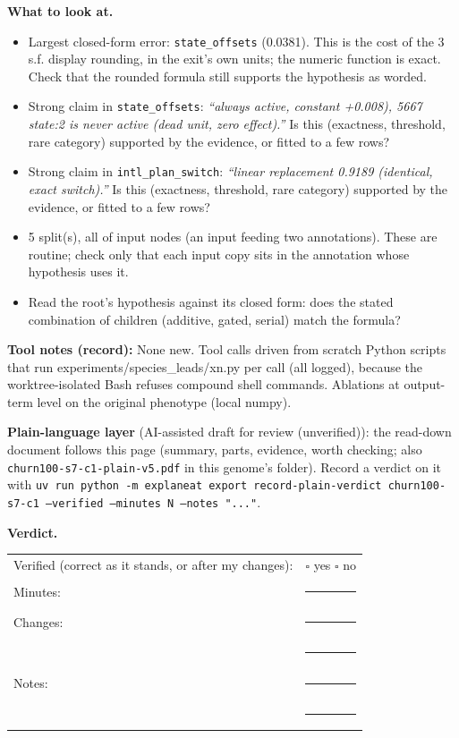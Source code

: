 \documentclass[a4paper,11pt]{article}
\begin{document}
\textbf{What to look at.}
\begin{itemize}
\item Largest closed-form error: \texttt{state\_\allowbreak{}offsets} (0.0381). This is the cost of the 3 s.f. display rounding, in the exit's own units; the numeric function is exact. Check that the rounded formula still supports the hypothesis as worded.
\item Strong claim in \texttt{state\_\allowbreak{}offsets}: \emph{``always active, constant +0.008), 5667 state:2 is never active (dead unit, zero effect).''} Is this (exactness, threshold, rare category) supported by the evidence, or fitted to a few rows?
\item Strong claim in \texttt{intl\_\allowbreak{}plan\_\allowbreak{}switch}: \emph{``linear replacement 0.9189 (identical, exact switch).''} Is this (exactness, threshold, rare category) supported by the evidence, or fitted to a few rows?
\item 5 split(s), all of input nodes (an input feeding two annotations). These are routine; check only that each input copy sits in the annotation whose hypothesis uses it.
\item Read the root's hypothesis against its closed form: does the stated combination of children (additive, gated, serial) match the formula?
\end{itemize}
\textbf{Tool notes (record):} None new. Tool calls driven from scratch Python scripts that run experiments/\allowbreak{}species\_\allowbreak{}leads/\allowbreak{}xn.py per call (all logged), because the worktree-isolated Bash refuses compound shell commands. Ablations at output-term level on the original phenotype (local numpy).

\textbf{Plain-language layer} (AI-assisted draft for review (unverified)): the read-down document follows this page (summary, parts, evidence, worth checking; also \texttt{churn100-s7-c1-plain-v5.pdf} in this genome's folder). Record a verdict on it with \texttt{uv run python -m explaneat export record-plain-verdict churn100-s7-c1 --verified --minutes N --notes "..."}.

\textbf{Verdict.}

\begin{tabularx}{\linewidth}{@{}lX@{}}
Verified (correct as it stands, or after my changes): & $\square$ yes \quad $\square$ no \\[4pt]
Minutes: & \rule{3cm}{0.4pt} \\[4pt]
Changes: & \rule{\linewidth}{0.4pt} \\[10pt]
 & \rule{\linewidth}{0.4pt} \\[4pt]
Notes: & \rule{\linewidth}{0.4pt} \\[10pt]
 & \rule{\linewidth}{0.4pt} \\
\end{tabularx}
\end{document}
